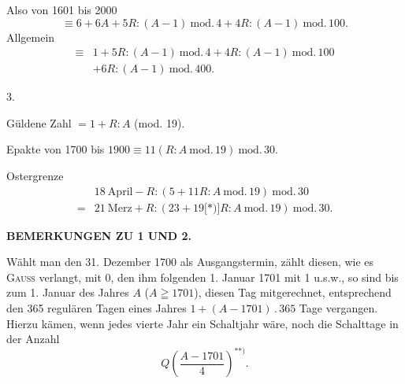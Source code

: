 \noindent Also von 1601 bis 2000
\[
\equiv6+6A+5R:(A-1)\ \mathrm{mod.}\,4+4R:(A-1)\ \mathrm{mod.}\,100.
\]
\noindent Allgemein
\[
\begin{aligned}
\equiv{}&1+5R:(A-1)\ \mathrm{mod.}\,4+4R:(A-1)\ \mathrm{mod.}\,100\\
&+6R:(A-1)\ \mathrm{mod.}\,400.
\end{aligned}
\]
\begin{center}3.\end{center}
\noindent\hspace*{\parindent}Güldene Zahl $=1+R:A$ (mod. 19).\par
\noindent\hspace*{\parindent}Epakte von 1700 bis $1900\equiv11(R:A\ \mathrm{mod.}\,19)\ \mathrm{mod.}\,30$.\par
\noindent\hspace*{\parindent}Ostergrenze
\[
\begin{aligned}
&18\ \text{April}-R:(5+11R:A\ \mathrm{mod.}\,19)\ \mathrm{mod.}\,30\\
={}&21\ \text{Merz}+R:(23+19\text{[*)]}R:A\ \mathrm{mod.}\,19)\ \mathrm{mod.}\,30.
\end{aligned}
\]
\begingroup\renewcommand{\thefootnote}{}\endgroup
\begin{center}\textbf{BEMERKUNGEN ZU 1 UND 2.}\end{center}
\begingroup\small
\noindent\hspace*{\parindent}Wählt man den 31. Dezember 1700 als Ausgangstermin, zählt diesen, wie es \textsc{Gauss} verlangt, mit 0, den ihm folgenden 1. Januar 1701 mit 1 u.s.w., so sind bis zum 1. Januar des Jahres $A$ ($A\geqq1701$), diesen Tag mitgerechnet, entsprechend den 365 regulären Tagen eines Jahres $1+(A-1701)\mathbin{.}365$ Tage vergangen. Hierzu kämen, wenn jedes vierte Jahr ein Schaltjahr wäre, noch die Schalttage in der Anzahl
\[
Q\left(\frac{A-1701}{4}\right)^{**)}.
\]
